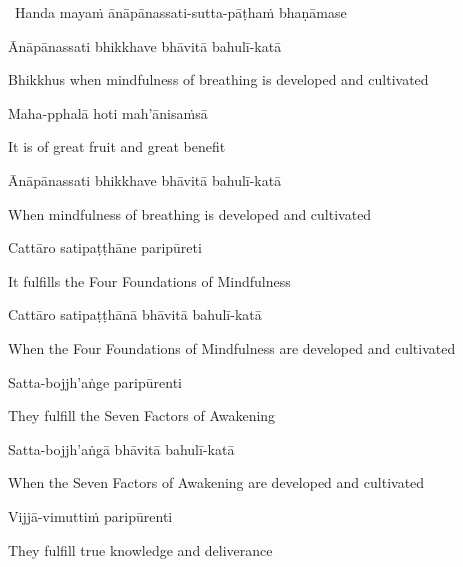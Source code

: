 \begin{leader}
  \anglebracketleft\ \hspace{-0.5mm}Handa mayaṁ ānāpānassati-sutta-pāṭhaṁ bhaṇāmase \hspace{-0.5mm}\anglebracketright\
\end{leader}

Ānāpānassati bhikkhave bhāvitā bahulī-katā

\begin{english}
  Bhikkhus when mindfulness of breathing is developed and cultivated
\end{english}

Maha-pphalā hoti mah'ānisaṁsā

\begin{english}
  It is of great fruit and great benefit
\end{english}

Ānāpānassati bhikkhave bhāvitā bahulī-katā

\begin{english}
  When mindfulness of breathing is developed and cultivated
\end{english}

Cattāro satipaṭṭhāne paripūreti

\begin{english}
  It fulfills the Four Foundations of Mindfulness
\end{english}

Cattāro satipaṭṭhānā bhāvitā bahulī-katā

\begin{english-hang}
  When the Four Foundations of Mindfulness are developed and cultivated
\end{english-hang}

Satta-bojjh'aṅge paripūrenti

\begin{english}
  They fulfill the Seven Factors of Awakening
\end{english}

Satta-bojjh'aṅgā bhāvitā bahulī-katā

\begin{english}
  When the Seven Factors of Awakening are developed and cultivated
\end{english}

Vijjā-vimuttiṁ paripūrenti

\begin{english}
  They fulfill true knowledge and deliverance
\end{english}


